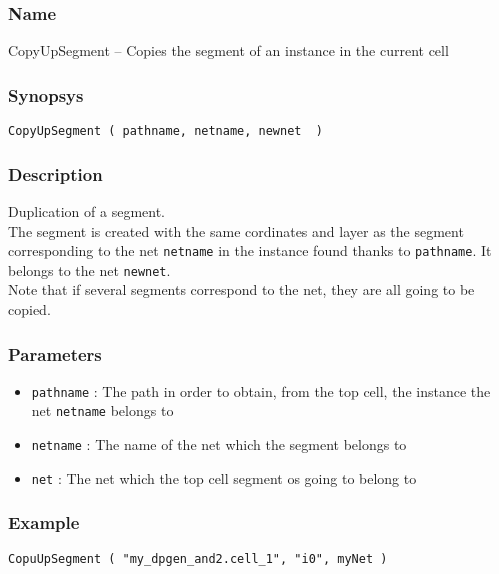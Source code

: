 \subsubsection{Name}

CopyUpSegment -- Copies the segment of an instance in the current cell

\subsubsection{Synopsys}

\begin{verbatim}
CopyUpSegment ( pathname, netname, newnet  )
\end{verbatim}

\subsubsection{Description}

Duplication of a segment.\\
\indent The segment is created with the same cordinates and layer as the segment corresponding to the net \verb-netname- in the instance found thanks to \verb-pathname-. It belongs to the net \verb-newnet-.\\
\indent Note that if several segments correspond to the net, they are all going to be copied.
    
\subsubsection{Parameters}

\begin{itemize}
    \item \verb-pathname- : The path in order to obtain, from the top cell, the instance the net \verb-netname- belongs to
    \item \verb-netname- : The name of the net which the segment belongs to
    \item \verb-net- : The net which the top cell segment os going to belong to
\end{itemize}
    
\subsubsection{Example}

\begin{verbatim}
CopuUpSegment ( "my_dpgen_and2.cell_1", "i0", myNet )
\end{verbatim}

